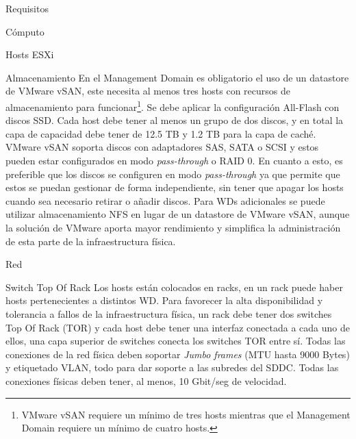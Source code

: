 \begin{section}{Requisitos}
\begin{subsection}{Cómputo}
\begin{subsubsection}{Hosts ESXi}
\end{subsubsection}
\end{subsection}
\begin{subsection}{Almacenamiento}
    En el Management Domain es obligatorio el uso de un datastore de VMware vSAN, este necesita al menos tres hosts con recursos de almacenamiento para funcionar\footnote{VMware vSAN requiere un mínimo de tres hosts mientras que el Management Domain requiere un mínimo de cuatro hosts.}. Se debe aplicar la configuración All-Flash con discos SSD. Cada host debe tener al menos un grupo de dos discos, y en total la capa de capacidad debe tener de 12.5 TB y 1.2 TB para la capa de caché. VMware vSAN soporta discos con adaptadores SAS, SATA o SCSI y estos pueden estar configurados en modo \textit{pass-through} o RAID 0. En cuanto a esto, es preferible que los discos se configuren en modo \textit{pass-through} ya que permite que estos se puedan gestionar de forma independiente, sin tener que apagar los hosts cuando sea necesario retirar o añadir discos.
    Para WDs adicionales se puede utilizar almacenamiento NFS en lugar de un datastore de VMware vSAN, aunque la solución de VMware aporta mayor rendimiento y simplifica la administración de esta parte de la infraestructura física.
\end{subsection}
\begin{subsection}{Red}
 \begin{subsubsection}{Switch Top Of Rack}
     Los hosts están colocados en racks, en un rack puede haber hosts pertenecientes a distintos WD. Para favorecer la alta disponibilidad y tolerancia a fallos de la infraestructura física, un rack debe tener dos switches Top Of Rack (TOR) y cada host debe tener una interfaz conectada a cada uno de ellos, una capa superior de switches conecta los switches TOR entre sí. Todas las conexiones de la red física deben soportar \textit{Jumbo frames} (MTU hasta 9000 Bytes) y etiquetado VLAN, todo para dar soporte a las subredes del SDDC. Todas las conexiones físicas deben tener, al menos, 10 Gbit/seg de velocidad.

\end{subsubsection}
\end{subsection}
\end{section}
